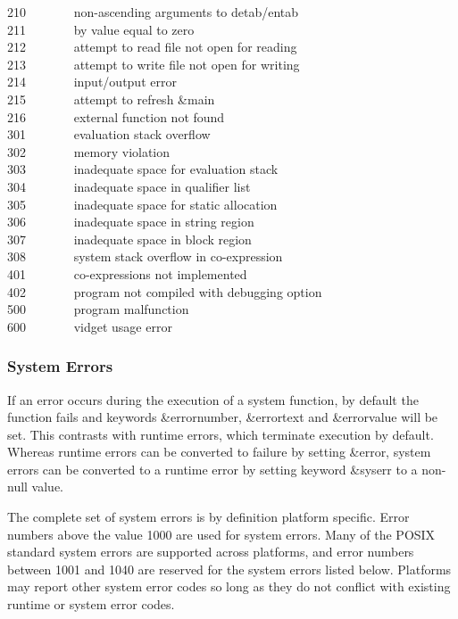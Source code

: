 210 \ \ \ \ \ \ \ non-ascending arguments to detab/entab\\
211 \ \ \ \ \ \ \ by value equal to zero\\
212 \ \ \ \ \ \ \ attempt to read file not open for reading\\
213 \ \ \ \ \ \ \ attempt to write file not open for writing\\
214 \ \ \ \ \ \ \ input/output error\\
215 \ \ \ \ \ \ \ attempt to refresh \&main\\
216 \ \ \ \ \ \ \ external function not found\\
301 \ \ \ \ \ \ \ evaluation stack overflow\\
302 \ \ \ \ \ \ \ memory violation\\
303 \ \ \ \ \ \ \ inadequate space for evaluation stack\\
304 \ \ \ \ \ \ \ inadequate space in qualifier list\\
305 \ \ \ \ \ \ \ inadequate space for static allocation\\
306 \ \ \ \ \ \ \ inadequate space in string region\\
307 \ \ \ \ \ \ \ inadequate space in block region\\
308 \ \ \ \ \ \ \ system stack overflow in co-expression\\
401 \ \ \ \ \ \ \ co-expressions not implemented\\
402 \ \ \ \ \ \ \ program not compiled with debugging option\\
500 \ \ \ \ \ \ \ program malfunction\\
600 \ \ \ \ \ \ \ vidget usage error

\subsubsection{System Errors}

If an error occurs during the execution of a system
function, by default the function fails and keywords \&errornumber,
\&errortext and \&errorvalue will be set. This contrasts with runtime
errors, which terminate execution by default. Whereas runtime errors
can be converted to failure by setting \&error, system errors can be
converted to a runtime error by setting keyword \&syserr to a non-null
value.

The complete set of system errors is by definition
platform specific. Error numbers above the value 1000 are used for
system errors. Many of the POSIX standard system errors are supported
across platforms, and error numbers between 1001 and 1040 are reserved
for the system errors listed below. Platforms may report other system
error codes so long as they do not conflict with existing runtime or
system error codes.


